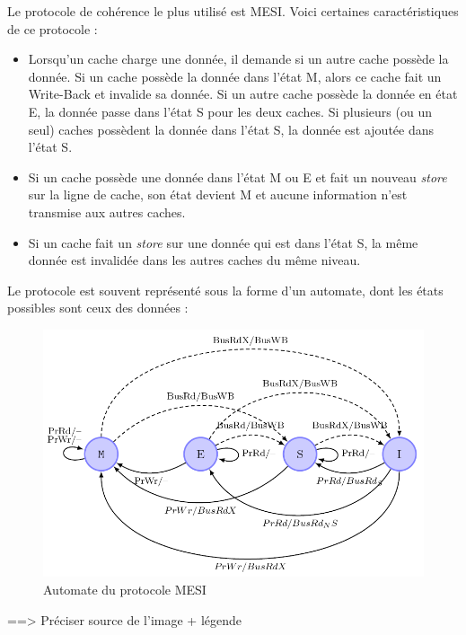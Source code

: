 Le protocole de cohérence le plus utilisé est MESI. Voici certaines caractéristiques de ce protocole : \\
\begin{itemize}
\item Lorsqu'un cache charge une donnée, il demande si un autre cache possède la donnée. Si un cache possède la donnée dans l'état M, alors ce cache fait un Write-Back et invalide sa donnée. Si un autre cache possède la donnée en état E, la donnée passe dans l'état S pour les deux caches. Si plusieurs (ou un seul) caches possèdent la donnée dans l'état S, la donnée est ajoutée dans l'état S.
\item Si un cache possède une donnée dans l'état M ou E et fait un nouveau \textit{store} sur la ligne de cache, son état devient M et aucune information n'est transmise aux autres caches.
\item Si un cache fait un \textit{store} sur une donnée qui est dans l'état S, la même donnée est invalidée dans les autres caches du même niveau. \\
\end{itemize}

Le protocole est souvent représenté sous la forme d'un automate, dont les états possibles sont ceux des données : \\

\begin{figure}[!h]
\begin{center}
   \includegraphics[scale=0.45]{images/mesi.png}
   \caption{\label{img:mesi} Automate du protocole MESI}
\end{center}
\end{figure}

==> Préciser source de l'image + légende\\

